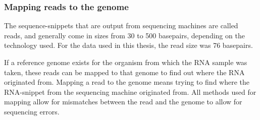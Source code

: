 \subsubsection{Mapping reads to the genome}
The sequence-snippets that are output from sequencing machines are called
reads, and generally come in sizes from 30 to 500 basepairs, depending on the
technology used. For the data used in this thesis, the read size was 76
basepairs.

If a reference genome exists for the organism from which the RNA sample was
taken, these reads can be mapped to that genome to find out where the RNA
originated from. Mapping a read to the genome means trying to find where the
RNA-snippet from the sequencing machine originated from. All methods used for
mapping allow for mismatches between the read and the genome to allow for
sequencing errors. 
